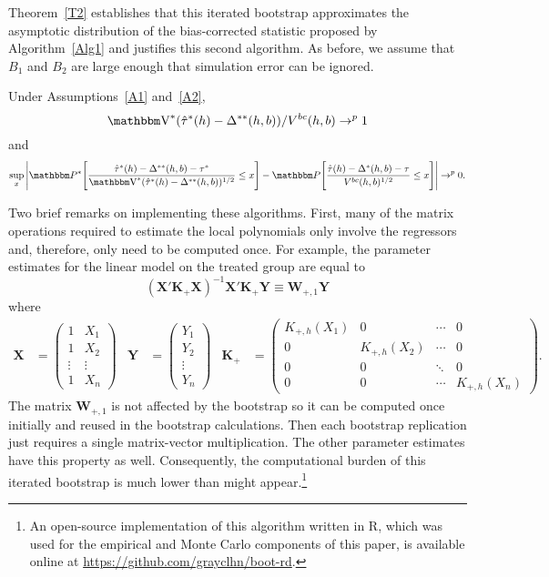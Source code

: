\documentclass[12pt,fleqn]{article}
\begin{document}
Theorem~\ref{T2} establishes that this iterated bootstrap approximates the
asymptotic distribution of the bias-corrected statistic proposed by
Algorithm~\ref{Alg1} and justifies this second algorithm.  As before, we assume
that $B_1$ and $B_2$ are large enough that simulation error can be ignored.

\begin{theorem}\label{T2}
  Under Assumptions~\ref{A1} and~\ref{A2},
  \begin{equation*}
    \V^*(\hat\tau^{*}(h) - \Delta^{**}(h,b))/V^{bc}(h,b) \to^p 1
  \end{equation*}
  and
  \begin{equation*}
    \sup_{x}
    \Bigg\rvert \Pr^*\Bigg[
    \frac{\hat\tau^{*}(h) - \Delta^{**}(h,b) - \tau^*}{\V^*(\hat\tau^{*}(h) - \Delta^{**}(h,b))^{1/2}}
    \leq x \Bigg]
    - \Pr\Bigg[\frac{\hat\tau(h) - \Delta^*(h,b) - \tau}{V^{bc}(h,b)^{1/2}}
    \leq x \Bigg] \Bigg\lvert \to^p 0.
  \end{equation*}
\end{theorem}

Two brief remarks on implementing these algorithms. First, many of the matrix operations
required to estimate the local polynomials only involve the regressors and,
therefore, only need to be computed once. For example, the parameter estimates
for the linear model on the treated group are equal to
\[
  (\mathbf{X}' \mathbf{K}_+ \mathbf{X})^{-1} \mathbf{X}' \mathbf{K}_+ \mathbf{Y}
  \equiv \mathbf{W}_{+,1}\mathbf{Y}
\]
where
\begin{align*}
\mathbf{X} &= \begin{pmatrix*} 1 & X_1 \\ 1 & X_2 \\ \vdots & \vdots \\ 1 & X_n \end{pmatrix*} &
\mathbf{Y} &= \begin{pmatrix*} Y_1 \\ Y_2 \\ \vdots \\ Y_n \end{pmatrix*} &
\mathbf{K}_+ &= \begin{pmatrix*}
  K_{+,h}(X_1) & 0 & \cdots & 0 \\
  0 & K_{+,h}(X_2) & \cdots & 0 \\
  0 & 0 & \ddots & 0 \\
  0 & 0 & \cdots & K_{+,h}(X_n) \end{pmatrix*}.
\end{align*}
The matrix $\mathbf{W}_{+,1}$ is not affected by the bootstrap so it can be
computed once initially and reused in the bootstrap calculations. Then each
bootstrap replication just requires a single matrix-vector multiplication. The
other parameter estimates have this property as well. Consequently, the
computational burden of this iterated bootstrap is much lower than might
appear.\footnote{%
  An open-source implementation of this algorithm written in R, which was used
  for the empirical and Monte Carlo components of this paper, is available
  online at \url{https://github.com/grayclhn/boot-rd}.} %
\end{document}
